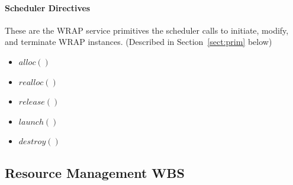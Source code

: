 \paragraph{Scheduler Directives}
These are the WRAP service primitives the scheduler calls to initiate,
modify, and terminate WRAP instances. (Described in
Section~\ref{sect:prim} below)

\begin{itemize}
\item{$alloc()$}
\item{$realloc()$}
\item{$release()$}
\item{$launch()$}
\item{$destroy()$}
\end{itemize}

\ifwbs
\subsection{Resource Management WBS}

